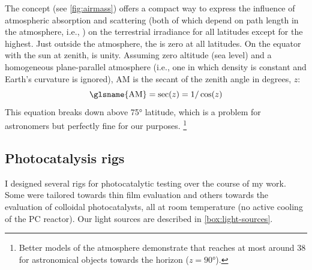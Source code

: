 \documentclass[draft,webedition,openright,titles,swedish,english]{LuaUUThesis}\usepackage[]{graphicx}\usepackage[]{xcolor}
\newcommand{\ie}{i.e.}
\newcommand{\seemore}[1]{\marginnote{%
   \noindent\tikz[baseline=(current bounding box.south)]%
   \node[text width=0.8\marginparwidth,align=left,rectangle,rounded corners,fill=blondsvag,font=\scriptsize]{#1};%
}}
\begin{document}
The  concept (see \cref{fig:airmass}) offers a compact way to express
the influence of atmospheric absorption and scattering (both of which depend on
path length in the atmosphere, \ie, ) on the terrestrial irradiance
for all latitudes except for the highest.
Just outside the atmosphere, the  is zero at all latitudes.
On the equator with the sun at zenith,  is unity.
Assuming zero altitude (sea level) and a homogeneous plane-parallel atmosphere
(\ie, one in which density is constant and Earth's curvature is ignored),
\seemore{\cref{photoec}}
\gls{AM} is the secant of the zenith angle in degrees, $z$:
\begin{equation}\label{eq:airmass}
\mathrm{\glsname{AM}} = \sec(z) = 1/\cos(z)
\end{equation}
This equation breaks down above \ang{75} latitude, which is a problem
for astronomers but perfectly fine for our purposes.%
\footnote{%
   Better models of the atmosphere \cite{Woolard1966} demonstrate that
    reaches at most around \num{38} for astronomical objects
   towards the horizon ($z=\ang{90}$).
}




\subsection{Photocatalysis rigs}
\label{pc:rigs}

I designed several rigs for photocatalytic testing over the course of my work.
Some were tailored towards thin film evaluation and others towards the
evaluation of colloidal photocatalysts, all at room temperature
(no active cooling of the \gls{PC} reactor).
Our light sources are described in \cref{box:light-sources}.

%
\end{document}
